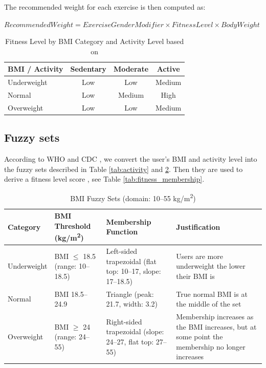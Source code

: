 \documentclass{article}
\begin{document}
The recommended weight for each exercise is then computed as:

$ Recommended Weight = Exercise Gender Modifier
                   \times Fitness Level
                   \times Body Weight $

\begin{table}[h]
\centering
\begin{tabular}{|l|c|c|c|}
\hline
\textbf{BMI / Activity} & \textbf{Sedentary} & \textbf{Moderate} & \textbf{Active} \\
\hline
Underweight & Low & Low & Medium \\
\hline
Normal & Low & Medium & High \\
\hline
Overweight & Low & Low & Medium \\
\hline
\end{tabular}
\caption{Fitness Level by BMI Category and Activity Level based on \cite{fitnessLevel}}
\label{tab:bmi_activity_risk}
\end{table}

\subsection{Fuzzy sets}

According to WHO \cite{activityLevel} and CDC \cite{bmi}, we convert the user's BMI and activity level into the fuzzy sets described in Table \ref{tab:activity} and \ref{tab:bmi}. Then they are used to derive a fitness level score \cite{fitnessLevel}, see Table \ref{tab:fitness_membership}.

\begin{table}[h]
\centering
\begin{tabular}{|l|p{3.5cm}|p{3.5cm}|p{4cm}|}
\hline
\textbf{Category} & \textbf{BMI Threshold (kg/m\textsuperscript{2})} & \textbf{Membership Function} & \textbf{Justification} \\
\hline
Underweight & BMI $\leq$ 18.5 \newline (range: 10--18.5) & Left-sided trapezoidal \newline (flat top: 10--17, slope: 17--18.5) & Users are more underweight the lower their BMI is \\
\hline
Normal & BMI 18.5--24.9 & Triangle \newline (peak: 21.7, width: 3.2) & True normal BMI is at the middle of the set \\
\hline
Overweight & BMI $\geq$ 24 \newline (range: 24--55) & Right-sided trapezoidal \newline (slope: 24--27, flat top: 27--55) & Membership increases as the BMI increases, but at some point the membership no longer increases \\
\hline
\end{tabular}
\caption{BMI Fuzzy Sets (domain: 10--55 kg/m\textsuperscript{2})}
\label{tab:bmi}
\end{table}
                                                                                                            
\end{document}
